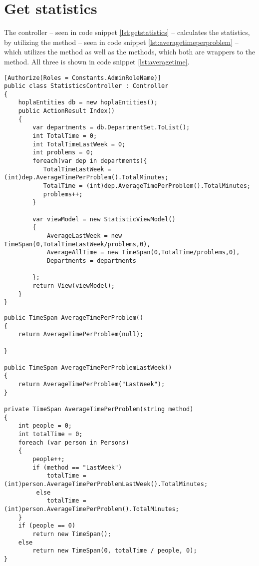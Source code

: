 \section{Get statistics}
\label{sec:getstatistics}

The  controller -- seen in code snippet \ref{lst:getstatistics} -- calculates the statistics, by utilizing the  method -- seen in code snippet \ref{lst:averagetimeperproblem} --  which utilizes the  method as well as the  methods, which both are wrappers to the  method. All three is shown in code snippet \ref{lst:averagetime}.


\begin{lstlisting}[style=sourceCode, caption=\myCaption{The StatisticsController controller}, label=lst:getstatistics]
[Authorize(Roles = Constants.AdminRoleName)]
public class StatisticsController : Controller
{
    hoplaEntities db = new hoplaEntities();
    public ActionResult Index()
    {
        var departments = db.DepartmentSet.ToList();
        int TotalTime = 0;
        int TotalTimeLastWeek = 0;
        int problems = 0;
        foreach(var dep in departments){
           TotalTimeLastWeek = (int)dep.AverageTimePerProblem().TotalMinutes;
           TotalTime = (int)dep.AverageTimePerProblem().TotalMinutes;
           problems++;
        }

        var viewModel = new StatisticViewModel()
        {
            AverageLastWeek = new TimeSpan(0,TotalTimeLastWeek/problems,0),
            AverageAllTime = new TimeSpan(0,TotalTime/problems,0),
            Departments = departments
            
        };
        return View(viewModel);
    }
}
\end{lstlisting}


\begin{lstlisting}[style=sourceCode, caption=\myCaption{The AverageTimePerProblem(string method) method -- which is found in the \cl{Department} class -- together with its wrappers.}, label=lst:averagetimeperproblem]
public TimeSpan AverageTimePerProblem()
{
    return AverageTimePerProblem(null);

}

public TimeSpan AverageTimePerProblemLastWeek()
{
    return AverageTimePerProblem("LastWeek");
}

private TimeSpan AverageTimePerProblem(string method)
{
    int people = 0;
    int totalTime = 0;
    foreach (var person in Persons)
    {
        people++;
        if (method == "LastWeek")
            totalTime = (int)person.AverageTimePerProblemLastWeek().TotalMinutes;
         else 
            totalTime = (int)person.AverageTimePerProblem().TotalMinutes;
    }
    if (people == 0)
        return new TimeSpan();
    else
        return new TimeSpan(0, totalTime / people, 0);
}
\end{lstlisting}

